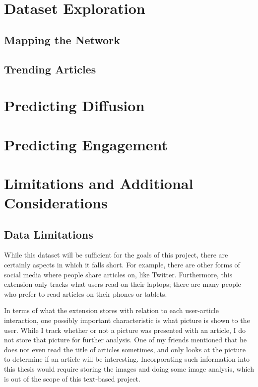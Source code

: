 \section{Dataset Exploration} \label{ch:exploration}
\subsection{Mapping the Network}
\subsection{Trending Articles}

\section{Predicting Diffusion}

\section{Predicting Engagement}

\section{Limitations and Additional Considerations} \label{sec:limitations}
\subsection{Data Limitations} \label{sec:datalims}
While this dataset will be sufficient for the goals of this project, there are certainly aspects in which it falls short.  For example, there are other forms of social media where people share articles on, like Twitter.  Furthermore, this extension only tracks what users read on their laptops; there are many people who prefer to read articles on their phones or tablets.

In terms of what the extension stores with relation to each user-article interaction, one possibly important characteristic is what picture is shown to the user.  While I track whether or not a picture was presented with an article, I do not store that picture for further analysis.  One of my friends mentioned that he does not even read the title of articles sometimes, and only looks at the picture to determine if an article will be interesting.  Incorporating such information into this thesis would require storing the images and doing some image analysis, which is out of the scope of this text-based project.

